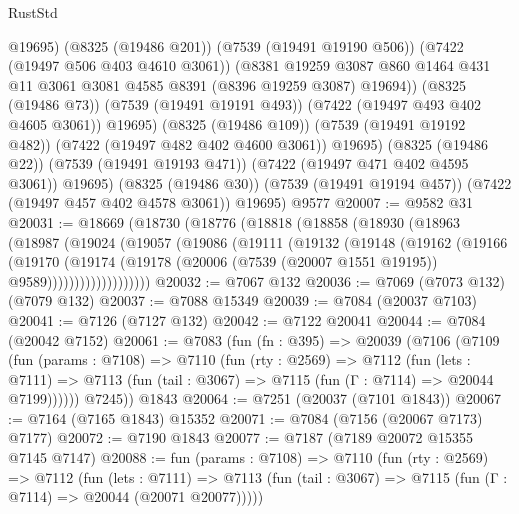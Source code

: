 \begin{lexlean}{RustStd}
\begin{coremodule}
                @19695)
              (@8325 (@19486 @201))
              (@7539 (@19491 @19190 @506))
              (@7422 (@19497 @506 @403 @4610 @3061))
              (@8381
                @19259
                @3087
                @860
                @1464
                @431
                @11
                @3061
                @3081
                @4585
                @8391
                (@8396 @19259 @3087)
                @19694))
            (@8325 (@19486 @73))
            (@7539 (@19491 @19191 @493))
            (@7422 (@19497 @493 @402 @4605 @3061))
            @19695)
          (@8325 (@19486 @109))
          (@7539 (@19491 @19192 @482))
          (@7422 (@19497 @482 @402 @4600 @3061))
          @19695)
        (@8325 (@19486 @22))
        (@7539 (@19491 @19193 @471))
        (@7422 (@19497 @471 @402 @4595 @3061))
        @19695)
      (@8325 (@19486 @30))
      (@7539 (@19491 @19194 @457))
      (@7422 (@19497 @457 @402 @4578 @3061))
      @19695)
    @9577
@20007 := @9582 @31
@20031 := @18669
    (@18730
      (@18776
        (@18818
          (@18858
            (@18930
              (@18963
                (@18987
                  (@19024
                    (@19057
                      (@19086
                        (@19111
                          (@19132
                            (@19148
                              (@19162
                                (@19166
                                  (@19170
                                    (@19174
                                      (@19178
                                        (@20006
                                          (@7539 (@20007 @1551 @19195))
                                          @9589)))))))))))))))))))
@20032 := @7067 @132
@20036 := @7069 (@7073 @132) (@7079 @132)
@20037 := @7088 @15349
@20039 := @7084 (@20037 @7103)
@20041 := @7126 (@7127 @132)
@20042 := @7122 @20041
@20044 := @7084 (@20042 @7152)
@20061 := @7083
    (fun (fn : @395) =>
    @20039
      (@7106
        (@7109
          (fun (params : @7108) =>
          @7110
            (fun (rty : @2569) =>
            @7112
              (fun (lets : @7111) =>
              @7113 (fun (tail : @3067) => @7115 (fun (Γ : @7114) => @20044 @7199))))))
        @7245))
    @1843
@20064 := @7251 (@20037 (@7101 @1843))
@20067 := @7164 (@7165 @1843) @15352
@20071 := @7084 (@7156 (@20067 @7173) @7177)
@20072 := @7190 @1843
@20077 := @7187 (@7189 @20072 @15355 @7145 @7147)
@20088 := fun (params : @7108) =>
  @7110
    (fun (rty : @2569) =>
    @7112
      (fun (lets : @7111) =>
      @7113 (fun (tail : @3067) => @7115 (fun (Γ : @7114) => @20044 (@20071 @20077)))))

\end{coremodule}
\end{lexlean}
